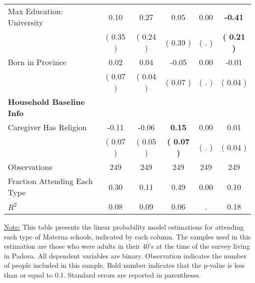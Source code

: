\begin{table}[H]
{\begin{tabular}{lccccc}
\quad Max Education: University &      0.10 &      0.27 &      0.05 &      0.00 & \textbf{    -0.41} \\
\quad  & (     0.35 ) & (     0.24 )  & (     0.39 )  & (        . ) & \textbf{(     0.21 )} \\
\quad Born in Province &      0.02 &      0.04 &     -0.05 &      0.00 &     -0.01 \\
\quad  & (     0.07 ) & (     0.04 )  & (     0.07 )  & (        . ) & (     0.04 ) \\
\midrule
\textbf{Household Baseline Info} \\
\quad Caregiver Has Religion &     -0.11 &     -0.06 & \textbf{     0.15} &      0.00 &      0.01 \\
\quad  & (     0.07 ) & (     0.05 )  & \textbf{(     0.07 )}  & (        . ) & (     0.04 ) \\
\midrule
Observations & 249 & 249 & 249 & 249 & 249 \\
Fraction Attending Each Type &      0.30 &      0.11 &      0.49 &      0.00 &      0.10 \\
\midrule
$ R^2$ &      0.08 &      0.09 &      0.06 &         . &      0.18 \\
\bottomrule
\end{tabular}}
\end{table}
\begin{scriptsize}
\noindent\underline{Note:} This table presents the linear probability model estimations for attending each type of Materna schools, indicated by each column. The samples used in this estimation are those who were adults in their 40's at the time of the survey living in Padova. All dependent variables are binary. Observation indicates the number of people included in this sample. Bold number indicates that the p-value is less than or equal to 0.1. Standard errors are reported in parentheses.
\end{scriptsize}
